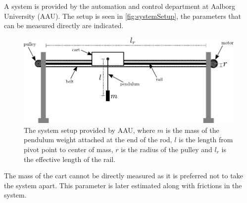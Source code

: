 
A system is provided by the automation and control department at Aalborg University (AAU). The setup is seen in \autoref{fig:systemSetup}, the parameters that can be measured directly are indicated.

\begin{figure}[H]
  \includegraphics[width=.8\textwidth]{figures/systemSetup}
  \caption{The system setup provided by AAU, where $m$ is the mass of the pendulum weight attached at the end of the rod, $l$ is the length from pivot point to center of mass, $r$ is the radius of the pulley and $l_r$ is the effective length of the rail.}
  \label{fig:systemSetup}
\end{figure}

The mass of the cart cannot be directly measured as it is preferred not to take the system apart. This parameter is later estimated along with frictions in the system. 

